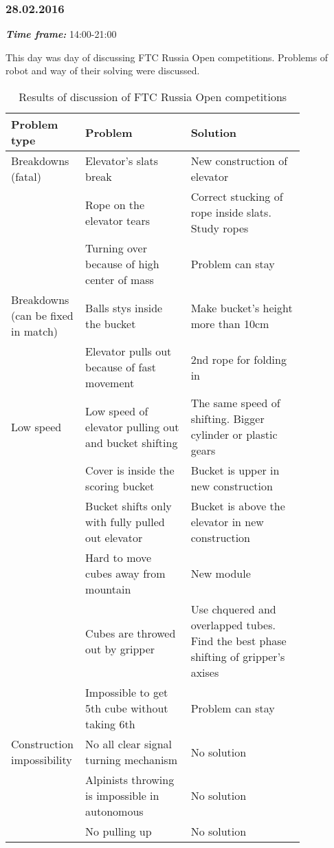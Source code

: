 \subsubsection{28.02.2016}
\textit{\textbf{Time frame:}} 14:00-21:00 

This day was day of discussing FTC Russia Open competitions. Problems of robot and way of their solving were discussed.

\begin{table}[H]
  \caption{Results of discussion of FTC Russia Open competitions}
  \label{tabular:meetingRUS28.02}
  \begin{center}
    \begin{tabular}{|p{0.12\linewidth}|p{0.35\linewidth}|p{0.38\linewidth}|}
 	  \hline
 	  Problem type & Problem & Solution \\
 	  \hline
 	  Breakdowns (fatal) & Elevator's slats break & New construction of elevator \\
 	  \hline
 	  & Rope on the elevator tears & Correct stucking of rope inside slats. Study ropes \\
      \hline
      & Turning over because of high center of mass	& Problem can stay \\
 	  \hline
 	  Breakdowns (can be fixed in match) & Balls stys inside the bucket & Make bucket's height more than 10cm \\
 	  \hline
 	  & Elevator pulls out because of fast movement	& 2nd rope for folding in \\
 	  \hline
 	  Low speed & Low speed of elevator pulling out and bucket shifting	& The same speed of shifting. Bigger cylinder or plastic gears \\
 	  \hline
 	  & Cover is inside the scoring bucket & Bucket is upper in new construction \\
 	  \hline
 	  & Bucket shifts only with fully pulled out elevator	& Bucket is above the elevator in new construction \\
 	  \hline
 	  & Hard to move cubes away from mountain & New module \\
 	  \hline
 	  & Cubes are throwed out by gripper & Use chquered and overlapped tubes. Find the best phase shifting of gripper's axises \\
 	  \hline
 	  & Impossible to get 5th cube without taking 6th & Problem can stay \\
 	  \hline
 	  Construction impossibility & No all clear signal turning mechanism & No solution\\	
 	  \hline
 	  & Alpinists throwing is impossible in autonomous & No solution \\
 	  \hline
 	  & No pulling up	& No solution\\
 	  \hline
    \end{tabular}
  \end{center}
\end{table}  
